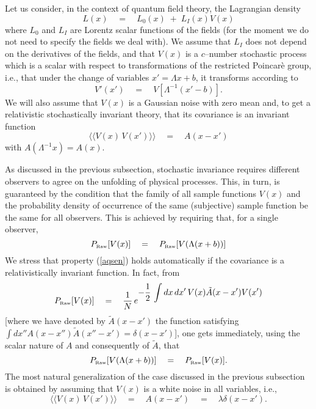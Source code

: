 \documentclass[10pt,a4paper]{article}
\newcommand{\llangle}{\langle\!\langle}
\newcommand{\rrangle}{\rangle\!\rangle}
\begin{document}
Let us consider, in the context of quantum field theory, the
Lagrangian density
\begin{equation}
L(x) \quad = \quad L_{0}(x) \; + \; L_{I}(x) V(x)
\end{equation}
where $L_{0}$ and $L_{I}$ are Lorentz scalar functions of the
fields (for the moment we do not need to specify the fields we
deal with). We assume that $L_{I}$ does not depend on the
derivatives of the fields, and that $V(x)$ is a $c$--number
stochastic process which is a scalar with respect to
transformations of the restricted Poincar\`e group, i.e., that
under the change of variables $x' = \Lambda x + b$, it transforms
according to
\begin{equation}
V'(x') \quad = \quad V[\Lambda^{-1}(x'-b)].
\end{equation}
We will also assume that $V(x)$ is a Gaussian noise with zero mean
and, to get a relativistic stochastically invariant theory, that
its covariance is an invariant function
\begin{equation} \label{qredm}
\llangle V(x)\, V(x') \rrangle \quad = \quad A(x-x')
\end{equation}
with $A(\Lambda^{-1} x) = A(x)$.

As discussed in the previous subsection, stochastic invariance
requires different observers to agree on the unfolding of physical
processes. This, in turn, is guaranteed by the condition that the
family of all sample functions $V(x)$ and the probability density
of occurrence of the same (subjective) sample function be the same
for all observers. This is achieved by requiring that, for a
single observer,
\begin{equation} \label{aqsen}
P_{\makebox{\tiny Raw}}[V(x)] \quad = \quad P_{\makebox{\tiny
Raw}}[V(\Lambda(x+b))]
\end{equation}
We stress that property (\ref{aqsen}) holds automatically if the
covariance is a relativistically invariant function. In fact, from
\begin{equation} \label{djbgb}
P_{\makebox{\tiny Raw}}[V(x)] \quad = \quad \frac{1}{N}\,
e^{\displaystyle -\frac{1}{2}\, \int dx\, dx'\, V(x) \tilde
A(x-x') V(x')}
\end{equation}
[where we have denoted by $\tilde A(x-x')$ the function satisfying
$\int dx'' A(x-x'')\tilde A(x''-x') = \delta(x-x')$], one gets
immediately, using the scalar nature of $A$ and consequently of
$\tilde A$, that
\begin{equation} \label{cderfv}
P_{\makebox{\tiny Raw}}[V(\Lambda(x+b))] \quad = \quad
P_{\makebox{\tiny Raw}}[V(x)].
\end{equation}
The most natural generalization of the case discussed in the
previous subsection is obtained by assuming that $V(x)$ is a white
noise in all variables, i.e.,
\begin{equation} \label{ulilb}
\llangle V(x)\, V(x') \rrangle \quad = \quad A(x-x') \quad = \quad
\lambda \delta(x-x').
\end{equation}
\end{document}
